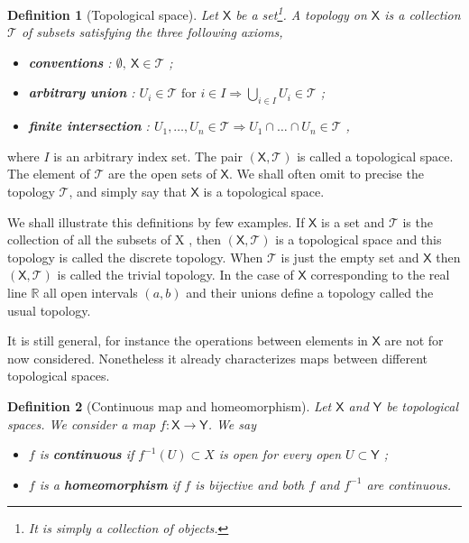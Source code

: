 \documentclass[12pt]{book}
\newcommand{\Tcal}{\mathcal{T}}
\newcommand{\Rbb}{\mathbb{R}}
\newcommand{\Xsf}{\mathsf{X}}
\newcommand{\Ysf}{\mathsf{Y}}
\theoremstyle{break}
\newtheorem{definition}{Definition}
\begin{document}
\begin{definition}[Topological space] 
Let $\Xsf$ be a set\footnote{It is simply a collection of objects.}. A topology on $\Xsf$ is a collection $\Tcal$ of subsets satisfying the three following axioms,%
%
\begin{itemize}
\item \textbf{conventions} : $\emptyset , \ \Xsf \in \Tcal$ ;
\item \textbf{arbitrary union} : $U_i \in \Tcal \mbox{ for } i \in I \Longrightarrow \bigcup_{i\in I} U_i \in \Tcal$ ;
\item \textbf{finite intersection} : $U_1 , \dots , U_n \in \Tcal \Longrightarrow U_1 \cap \dots \cap U_n \in \Tcal$ ,
\end{itemize}
%
\end{definition}
%
where $I$ is an arbitrary index set. The pair $(\Xsf,\Tcal)$ is called a topological space. The element of $\Tcal$ are the open sets of $\Xsf$. We shall often omit to precise the topology $\Tcal$, and simply say that $\Xsf$ is a topological space. 




We shall illustrate this definitions by few examples. If $\Xsf$ is a set and $\Tcal$ is the collection of all the subsets of X , then $(\Xsf,\Tcal)$ is a topological space and this topology is called the discrete topology. When $\Tcal$ is just the empty set and $\Xsf$ then $(\Xsf,\Tcal)$ is called the trivial topology. In the case of $\Xsf$ corresponding to the real line $\Rbb$ all open intervals $(a,b)$ and their unions define a topology called the usual topology. 




It is still general, for instance the operations between elements in $\Xsf$ are not for now considered. Nonetheless it already characterizes maps between different topological spaces.


\begin{definition}[Continuous map and homeomorphism]
%
Let $\Xsf$ and $\Ysf$ be topological spaces. We consider a map $f : \Xsf \to \Ysf$. We say
%
\begin{itemize}
\item $f$ is \textbf{continuous} if $f^{-1}(U) \subset X$ is open for every open $U \subset\Ysf$ ;
\item $f$ is a \textbf{homeomorphism} if $f$ is bijective and both $f$ and $f^{-1}$ are continuous.
\end{itemize}
%
\end{definition}
\end{document}
